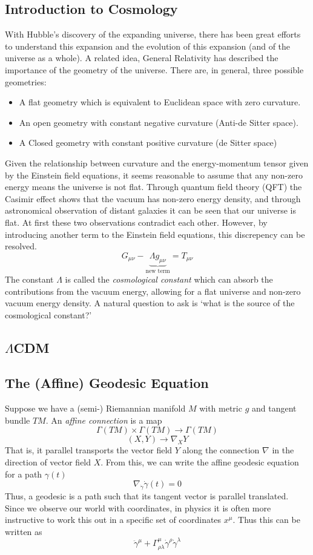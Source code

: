 \subsection{Introduction to Cosmology}
With Hubble's discovery of the expanding universe, there has been great efforts to understand this expansion and the evolution of this expansion (and of the universe as a whole).
A related idea, General Relativity has described the importance of the geometry of the universe.
There are, in general, three possible geometries:
\begin{itemize}
    \item A flat geometry which is equivalent to Euclidean space with zero curvature.
    \item An open geometry with constant negative curvature (Anti-de Sitter space).
    \item A Closed geometry with constant positive curvature (de Sitter space)
\end{itemize}
Given the relationship between curvature and the energy-momentum tensor given by the Einstein field equations, it seems reasonable to assume that any non-zero energy means the universe is not flat.
Through quantum field theory (QFT) the Casimir effect shows that the vacuum has non-zero energy density, and through astronomical observation of distant galaxies it can be seen that our universe is flat.
At first these two observations contradict each other. However, by introducing another term to the Einstein field equations, this discrepency can be resolved.
\[ G_{\mu\nu} - \underbrace{\Lambda g_{\mu\nu}}_{\text{new term}} = T_{\mu\nu} \]
The constant $\Lambda$ is called the \textit{cosmological constant} which can absorb the contributions from the vacuum energy, allowing for a flat universe and non-zero vacuum energy density.
A natural question to ask is `what is the source of the cosmological constant?'

\subsection{$\Lambda$CDM}

\subsection{The (Affine) Geodesic Equation}
Suppose we have a (semi-) Riemannian manifold $M$ with metric $g$ and tangent bundle $TM$. An \textit{affine connection} is a map
\[ \Gamma (TM) \times \Gamma (TM) \rightarrow \Gamma (TM) \]
\[ (X,Y) \rightarrow \nabla_X Y \]
That is, it parallel transports the vector field $Y$ along the connection $\nabla$ in the direction of vector field $X$. From this, we can write the affine geodesic equation for a path $\gamma(t)$
\[ \nabla_{\dot\gamma} \dot\gamma(t) = 0 \]
Thus, a geodesic is a path such that its tangent vector is parallel translated. Since we observe our world with coordinates, in physics it is often more instructive to work this out in a specific set of coordinates $x^\mu$. Thus this can be written as
\[ \ddot{\gamma}^\mu + \Gamma^{\mu}_{\rho\lambda}\dot{\gamma}^\rho \dot{\gamma}^\lambda  \]


